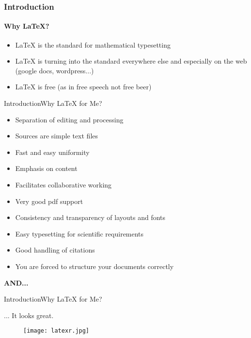 \documentclass[xcolor={dvipsnames}]{beamer}
\begin{document}
\begin{frame}
\frametitle{Introduction}\framesubtitle{Why {\LaTeX}?}
\begin{itemize}
\item {\LaTeX} is the standard for mathematical typesetting
\item {\LaTeX} is turning into the standard everywhere else and especially on the web (google docs, wordpress...)
\item {\LaTeX} is free (as in free speech not free beer)
\end{itemize}

\end{frame}
\begin{frame}{Introduction}{Why {\LaTeX} for Me?}
\begin{itemize}
\item Separation of editing and processing
\item Sources are simple text files
\item Fast and easy uniformity
\item Emphasis on content
\item Facilitates collaborative working
\item Very good pdf support
\item Consistency and transparency of layouts and fonts
\item Easy typesetting for scientific requirements
\item Good handling of citations
\item You are forced to structure your documents correctly
\end{itemize}

\begin{center}
\textbf{AND...}

\end{center}
\end{frame}

\begin{frame}{Introduction}{Why {\LaTeX} for Me?}

... It looks great.

\begin{figure}[H]
		\texttt{[image: latexr.jpg]}
\end{figure}

\end{frame}
\end{document}
